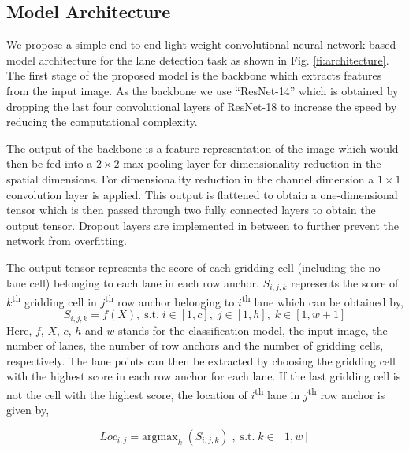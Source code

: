 \documentclass[conference]{IEEEtran}
\begin{document}
\subsection{Model Architecture}
\label{ssec:Arch}



We propose a simple end-to-end light-weight convolutional neural network based model architecture for the lane detection task as shown in Fig. \ref{fi:architecture}. The first stage of the proposed model is the backbone which extracts features from the input image. As the backbone we use ``ResNet-14'' which is obtained by dropping the last four convolutional layers of ResNet-18 \cite{he2016deep} to increase the speed by reducing the computational complexity. 

The output of the backbone is a feature representation of the image which would then be fed into a $2 \times 2$ max pooling layer for dimensionality reduction in the spatial dimensions. For dimensionality reduction in the channel dimension a $1 \times 1$ convolution layer is applied. This output is flattened to obtain a one-dimensional tensor which is then passed through two fully connected layers to obtain the output tensor. Dropout layers are implemented in between to further prevent the network from overfitting.

The output tensor represents the score of each gridding cell (including the no lane cell) belonging to each lane in each row anchor. $S_{i,j,k}$ represents the score of $k$\textsuperscript{th} gridding cell in $j$\textsuperscript{th} row anchor belonging to $i$\textsuperscript{th} lane which can be obtained by, 
\begin{equation}
\label{eq:lane_rep}
S_{i,j,k}=f(X), \;
\text{s.t.} \; i\in[1,c], \; j\in[1,h], \; k\in[1,w+1]
\end{equation}
\normalsize
Here, $f$, $X$, $c$, $h$ and $w$ stands for the classification model, the input image, the number of lanes, the number of row anchors and the number of gridding cells, respectively. The lane points can then be extracted by choosing the gridding cell with the highest score in each row anchor for each lane. If the last gridding cell is not the cell with the highest score, the location of $i$\textsuperscript{th} lane in $j$\textsuperscript{th} row anchor is given by, 

\begin{equation}
\label{eq:location}
Loc_{i,j}=\mathrm{argmax}_{k}\; (S_{i,j,k})\;, \; \text{s.t.} \; k \in [1,w] 
\end{equation}
\end{document}
